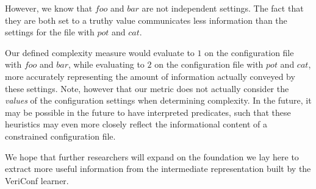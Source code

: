 However, we know that $foo$ and $bar$ are not independent settings.
The fact that they are both set to a truthy value communicates less
information than the settings for the file with $pot$ and $cat$.

Our defined complexity measure would evaluate to $1$ on the
configuration file with $foo$ and $bar$, while evaluating to $2$ on
the configuration file with $pot$ and $cat$, more accurately representing
the amount of information actually conveyed by these settings. Note,
however that our metric does not actually consider the {\it values}
of the configuration settings when determining complexity. In the
future, it may be possible in the future to have interpreted predicates,
such that these heuristics may even more closely reflect the informational
content of a constrained configuration file.

We hope that further researchers will expand on the foundation we lay
here to extract more useful information from the intermediate
representation built by the VeriConf learner.

\iffalse

it may be possible in the future to have interpreted predicates,
such that these heuristics may more accurately reflect the informational
content of a constrained configuration file.

Use the listing in figure 2 to put together an example of why the
naive implementation of complexity doesn't give as much of an idea
of what is going on as our heuristic.

Additional refinement of a complexity metric could take into account
when learned rules are violated (indicating potentially brittle
configuration state)

\fi





